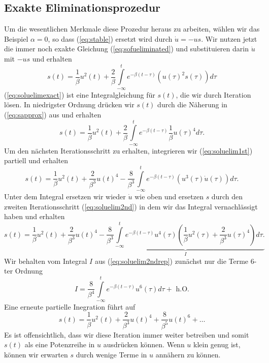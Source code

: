 \subsection{Exakte Eliminationsprozedur}
Um die wesentlichen Merkmale diese Prozedur heraus zu arbeiten, wählen wir das
Beispiel $\alpha=0$, so dass (\ref{eq:stable}) ersetzt wird durch $\dot u=-us$.
Wir nutzen jetzt die immer noch exakte Gleichung (\ref{eq:sofueliminated}) und
substituieren darin $\dot u$ mit $-us$ und erhalten
\begin{equation}
  s(t)=\frac{1}{\beta}u^2(t)+\frac{2}{\beta}\int\limits_{-\infty}^{t}e^{-\beta(t-\tau)}
  (u(\tau)^2 s(\tau))d\tau
  \label{eq:soluelimexact}
\end{equation}
(\ref{eq:soluelimexact}) ist eine Integralgleichung für $s(t)$, die wir durch
Iteration lösen. In niedrigster Ordnung drücken wir $s(t)$ durch die Näherung
in (\ref{eq:sapprox}) aus und erhalten
\begin{equation}
  s(t)=\frac{1}{\beta}u^2(t)+\frac{2}{\beta}\int\limits_{-\infty}^{t}e^{-\beta(t-\tau)}
  \frac{1}{\beta}u(\tau)^4d\tau .
  \label{eq:soluelim1st}
\end{equation}
Um den nächsten Iterationsschritt zu erhalten, integrieren wir
(\ref{eq:soluelim1st}) partiell und erhalten 
\begin{equation}
  s(t)=\frac{1}{\beta}u^2(t)+\frac{2}{\beta^3}u(t)^4-
  \frac{8}{\beta^3}\int\limits_{-\infty}^{t}e^{-\beta(t-\tau)}
  (u^3(\tau)\dot u(\tau))d\tau .
  \label{eq:soluelim2nd}
\end{equation}
Unter dem Integral ersetzen wir wieder $\dot u$ wie oben und ersetzen $s$ durch
den zweiten Iterationsschritt (\ref{eq:soluelim2nd}) in dem wir das Integral
vernachlässigt haben und erhalten
\begin{equation}
  s(t)=\frac{1}{\beta}u^2(t)+\frac{2}{\beta^3}u(t)^4-
  \underbrace{
    \frac{8}{\beta^3}\int\limits_{-\infty}^{t}e^{-\beta(t-\tau)}u^4(\tau)
  \left(\frac{1}{\beta}u^2(\tau)+\frac{2}{\beta^3}u(\tau)^4\right)d\tau .
  }_{I}
  \label{eq:soluelim2ndrep}
\end{equation}
Wir behalten vom Integral $I$ aus (\ref{eq:soluelim2ndrep}) zunächst nur die
Terme 6-ter Ordnung
\[ 
  I=\frac{8}{\beta^4}\int\limits_{-\infty}^{t}e^{-\beta(t-\tau)}
  u^6(\tau)d\tau+\text{ h.O.}
\]
Eine erneute partielle Inegration führt auf
\[ 
  s(t)=\frac{1}{\beta}u^2(t)+\frac{2}{\beta^3}u(t)^4+\frac{8}{\beta^5}u(t)^6+\dots
\]
Es ist offensichtlich, dass wir diese Iteration immer weiter betreiben und
somit $s(t)$ als eine Potenzreihe in $u$ ausdrücken können. Wenn $u$ klein
genug ist, können wir erwarten $s$ durch wenige Terme in $u$ annähern zu
können.

